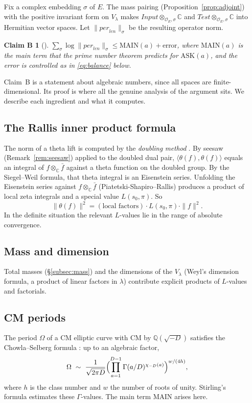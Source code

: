 \documentclass[11pt]{amsart}
\newtheorem*{claimB}{Claim B}
\theoremstyle{definition}
\theoremstyle{remark}
\newcommand{\OEring}{\mathcal{O}_E}
\newcommand{\Input}{\mathit{Input}}
\newcommand{\Test}{\mathit{Test}}
\newcommand{\per}{\mathit{per}}
\newcommand{\len}{\mathit{len}}
\newcommand{\Q}{\mathbb{Q}}
\newcommand{\C}{\mathbb{C}}
\newcommand{\ASK}{\mathrm{ASK}}
\newcommand{\MAIN}{\mathrm{MAIN}}
\begin{document}
Fix a complex embedding $\sigma$ of $E$. The mass pairing (Proposition~\ref{prop:adjoint}) with the positive invariant form on $V_\lambda$ makes $\Input\otimes_{\OEring,\sigma}\C$ and $\Test\otimes_{\OEring,\sigma}\C$ into Hermitian vector spaces. Let $\|\per_\len\|_\sigma$ be the resulting operator norm.

\begin{claimB}[{\cite{Alpoge,Zhang,golf}}]
$\sum_\sigma\log\|\per_\len\|_\sigma\le\MAIN(a)+\text{error}$, where $\MAIN(a)$ is the main term that the prime number theorem predicts for $\ASK(a)$, and the error is controlled as in \eqref{eq:balance} below.
\end{claimB}

Claim~B is a statement about algebraic numbers, since all spaces are finite-dimensional. Its proof is where all the genuine analysis of the argument sits. We describe each ingredient and what it computes.

\subsection*{The Rallis inner product formula}
The norm of a theta lift is computed by the \emph{doubling method} \cite{GQT}. By seesaw (Remark~\ref{rem:seesaw}) applied to the doubled dual pair, $\langle\theta(f),\theta(f)\rangle$ equals an integral of $f\otimes_{\C}\bar f$ against a theta function on the doubled group. By the Siegel--Weil formula, that theta integral is an Eisenstein series. Unfolding the Eisenstein series against $f\otimes_{\C}\bar f$ (Piatetski-Shapiro--Rallis) produces a product of local zeta integrals and a special value $L(s_0,\pi)$. So
\[
\|\theta(f)\|^2=(\text{local factors})\cdot L(s_0,\pi)\cdot\|f\|^2 .
\]
In the definite situation the relevant $L$-values lie in the range of absolute convergence.

\subsection*{Mass and dimension}
Total masses (\S\ref{subsec:mass}) and the dimensions of the $V_\lambda$ (Weyl's dimension formula, a product of linear factors in $\lambda$) contribute explicit products of $L$-values and factorials.

\subsection*{CM periods}
The period $\Omega$ of a CM elliptic curve with CM by $\Q(\sqrt{-D})$ satisfies the Chowla--Selberg formula \cite{Chowla-Selberg}: up to an algebraic factor,
\[
\Omega\ \sim\ \frac{1}{\sqrt{2\pi D}}\Bigl(\prod_{a=1}^{D-1}\Gamma(a/D)^{\chi_{-D}(a)}\Bigr)^{w/(4h)},
\]
where $h$ is the class number and $w$ the number of roots of unity. Stirling's formula estimates these $\Gamma$-values. The main term $\MAIN$ arises here.
\end{document}
